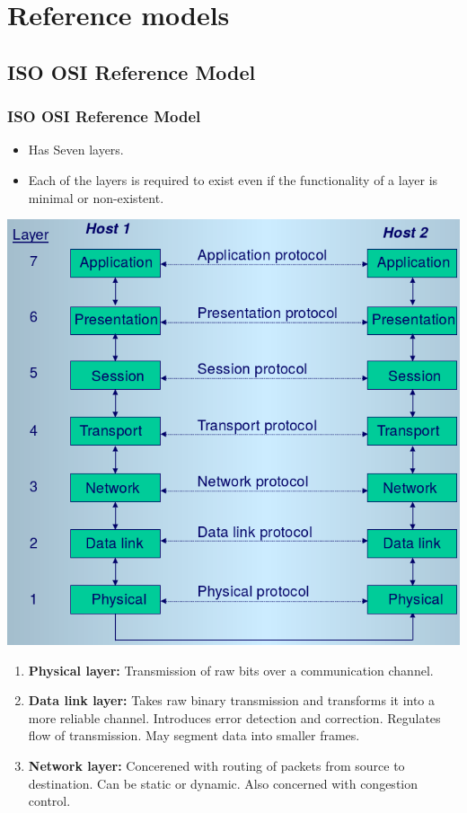 \documentclass{beamer}
\begin{document}
\section{Reference models}
\subsection{ISO OSI Reference Model}
\begin{frame}[allowframebreaks]
\frametitle{ISO OSI Reference Model}
\begin{itemize}
\item Has {\color{red} Seven} layers.
\item Each of the layers is required to exist even if the functionality of a layer is minimal or non-existent.
\end{itemize}
\includegraphics[scale=0.25]{osi.png}
\begin{enumerate}
\item \textbf{Physical layer:} Transmission of raw bits over a communication channel.
\item \textbf{Data link layer:} Takes raw binary transmission and transforms it into a more reliable channel. Introduces error detection and correction. Regulates flow of transmission. May segment data into smaller frames.
\item \textbf{Network layer:} Concerened with routing of packets from source to destination. Can be static or dynamic. Also concerned with congestion control.

\end{enumerate}
\end{frame}
\end{document}
